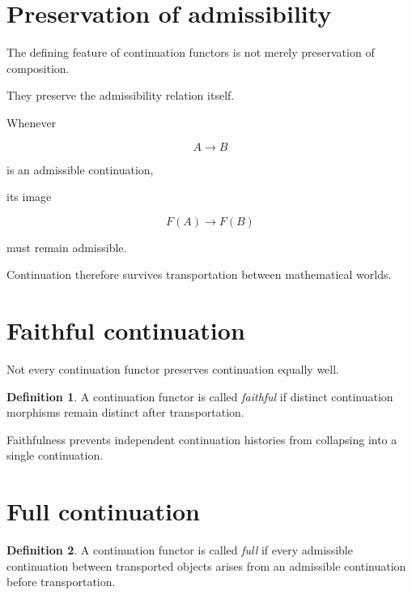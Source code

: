 \documentclass[13pt,openany]{book}
\theoremstyle{plain}
\theoremstyle{definition}
\newtheorem{definition}{Definition}[chapter]
\begin{document}
\section{Preservation of admissibility}

The defining feature of continuation functors is not merely preservation of
composition.

They preserve the admissibility relation itself.

Whenever

\[
A
\longrightarrow
B
\]

is an admissible continuation,

its image

\[
F(A)
\longrightarrow
F(B)
\]

must remain admissible.

Continuation therefore survives transportation between mathematical worlds.

\section{Faithful continuation}

Not every continuation functor preserves continuation equally well.

\begin{definition}

A continuation functor is called
\emph{faithful}
if distinct continuation morphisms remain distinct after transportation.

\end{definition}

Faithfulness prevents independent continuation histories from collapsing into a
single continuation.

\section{Full continuation}

\begin{definition}

A continuation functor is called
\emph{full}
if every admissible continuation between transported objects arises from an
admissible continuation before transportation.

\end{definition}
\end{document}
